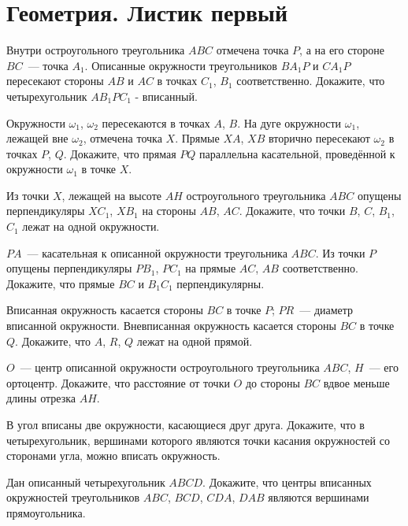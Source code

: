 

\section*{Геометрия. Листик первый}


\begin{problems}

\item
Внутри остроугольного треугольника $ABC$ отмечена точка $P$, а на его стороне
$BC$~--- точка $A_1$.
Описанные окружности треугольников $B A_1 P$ и $C A_1 P$ пересекают стороны
$AB$ и $AC$ в точках $C_1$, $B_1$ соответственно.
Докажите, что четырехугольник $A B_1 P C_1$ - вписанный.

\item
Окружности $\omega_1$, $\omega_2$ пересекаются в точках $A$, $B$.
На дуге окружности $\omega_1$, лежащей вне $\omega_2$, отмечена точка $X$.
Прямые $XA$, $XB$ вторично пересекают $\omega_2$ в точках $P$, $Q$.
Докажите, что прямая $PQ$ параллельна касательной, проведённой к окружности
$\omega_1$ в точке $X$.

\item
Из точки $X$, лежащей на высоте $AH$ остроугольного треугольника $ABC$ опущены
перпендикуляры $X C_1$, $X B_1$ на стороны $AB$, $AC$.
Докажите, что точки $B$, $C$, $B_1$, $C_1$ лежат на одной окружности.

\item
$PA$~--- касательная к описанной окружности треугольника $ABC$.
Из точки $P$ опущены перпендикуляры $P B_1$, $P C_1$ на прямые $AC$,
$AB$ соответственно.
Докажите, что прямые $BC$ и $B_1 C_1$ перпендикулярны.

\item
Вписанная окружность касается стороны $BC$ в точке $P$;
$PR$~--- диаметр вписанной окружности.
Вневписанная окружность касается стороны $BC$ в точке $Q$.
Докажите, что $A$, $R$, $Q$ лежат на одной прямой.

\item
$O$~--- центр описанной окружности остроугольного треугольника $ABC$,
$H$~--- его ортоцентр.
Докажите, что расстояние от точки $O$ до стороны $BC$ вдвое меньше длины
отрезка $AH$.

\item
В угол вписаны две окружности, касающиеся друг друга.
Докажите, что в четырехугольник, вершинами которого являются точки касания
окружностей со сторонами угла, можно вписать окружность.

\item
Дан описанный четырехугольник $ABCD$.
Докажите, что центры вписанных окружностей треугольников
$ABC$, $BCD$, $CDA$, $DAB$ являются вершинами прямоугольника.

\end{problems}

